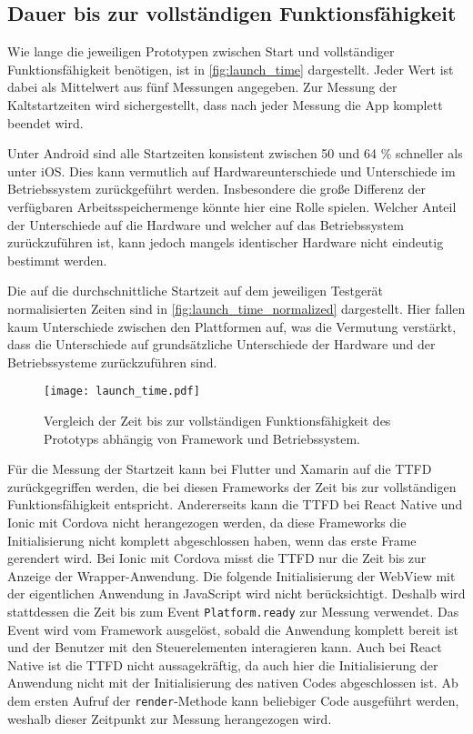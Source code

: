 \subsection{Dauer bis zur vollständigen Funktionsfähigkeit}

Wie lange die jeweiligen Prototypen zwischen Start und vollständiger Funktionsfähigkeit benötigen, ist in \autoref{fig:launch_time} dargestellt.
Jeder Wert ist dabei als Mittelwert aus fünf Messungen angegeben.
Zur Messung der Kaltstartzeiten wird sichergestellt, dass nach jeder Messung die App komplett beendet wird.

Unter Android sind alle Startzeiten konsistent zwischen 50 und 64 \% schneller als unter iOS.
Dies kann vermutlich auf Hardwareunterschiede und Unterschiede im Betriebssystem zurückgeführt werden.
Insbesondere die große Differenz der verfügbaren Arbeitsspeichermenge könnte hier eine Rolle spielen.
Welcher Anteil der Unterschiede auf die Hardware und welcher auf das Betriebssystem zurückzuführen ist, kann jedoch mangels identischer Hardware nicht eindeutig bestimmt werden.

Die auf die durchschnittliche Startzeit auf dem jeweiligen Testgerät normalisierten Zeiten sind in \autoref{fig:launch_time_normalized} dargestellt.
Hier fallen kaum Unterschiede zwischen den Plattformen auf, was die Vermutung verstärkt, dass die Unterschiede auf grundsätzliche Unterschiede der Hardware und der Betriebssysteme zurückzuführen sind.
\begin{figure}[ht]
  \centering 
  \texttt{[image: launch\_time.pdf]}
  \caption{Vergleich der Zeit bis zur vollständigen Funktionsfähigkeit des Prototyps abhängig von Framework und Betriebssystem.}
  \label{fig:launch_time}
\end{figure}


Für die Messung der Startzeit kann bei Flutter und Xamarin auf die \ac{TTFD} zurückgegriffen werden, die bei diesen Frameworks der Zeit bis zur vollständigen Funktionsfähigkeit entspricht.
Andererseits kann die \ac{TTFD} bei React Native und Ionic mit Cordova nicht herangezogen werden, da diese Frameworks die Initialisierung nicht komplett abgeschlossen haben, wenn das erste Frame gerendert wird.
Bei Ionic mit Cordova misst die \ac{TTFD} nur die Zeit bis zur Anzeige der Wrapper-Anwendung.
Die folgende Initialisierung der WebView mit der eigentlichen Anwendung in JavaScript wird nicht berücksichtigt.
Deshalb wird stattdessen die Zeit bis zum Event \texttt{Platform.ready} zur Messung verwendet.
Das Event wird vom Framework ausgelöst, sobald die Anwendung komplett bereit ist und der Benutzer mit den Steuerelementen interagieren kann.
Auch bei React Native ist die \ac{TTFD} nicht aussagekräftig, da auch hier die Initialisierung der Anwendung nicht mit der Initialisierung des nativen Codes abgeschlossen ist.
Ab dem ersten Aufruf der \texttt{render}-Methode kann beliebiger Code ausgeführt werden, weshalb dieser Zeitpunkt zur Messung herangezogen wird.

